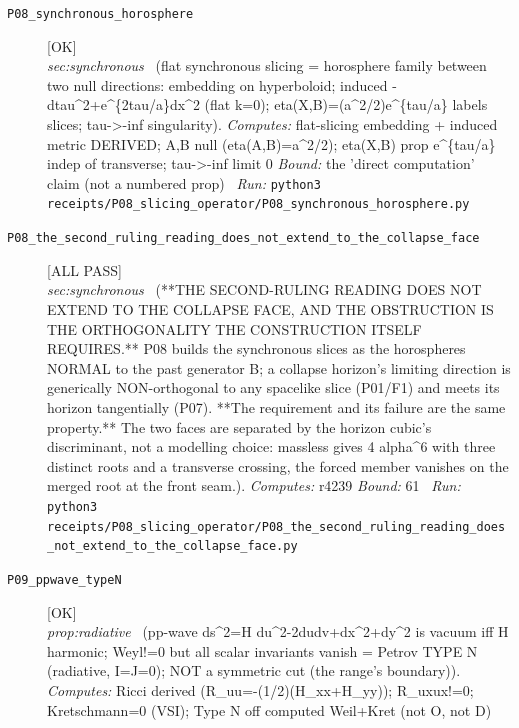 \begin{description}
\item[\label{rcpt:P08_synchronous_horosphere}\texttt{P08\_synchronous\_horosphere}]\hfill\textsf{[OK]}\\
\textit{sec:synchronous} \ (flat synchronous slicing = horosphere family between two null directions: embedding on hyperboloid; induced -dtau\textasciicircum{}2+e\textasciicircum{}\{2tau/a\}dx\textasciicircum{}2 (flat k=0); eta(X,B)=(a\textasciicircum{}2/2)e\textasciicircum{}\{tau/a\} labels slices; tau->-inf singularity). 
\emph{Computes:} flat-slicing embedding + induced metric DERIVED; A,B null (eta(A,B)=a\textasciicircum{}2/2); eta(X,B) prop e\textasciicircum{}\{tau/a\} indep of transverse; tau->-inf limit 0
 \emph{Bound:} the 'direct computation' claim (not a numbered prop)
\ \emph{Run:} \texttt{python3 receipts/P08\_slicing\_operator/P08\_synchronous\_horosphere.py}
\item[\label{rcpt:P08_the_second_ruling_reading_does_not_extend_to_the_collapse_face}\texttt{P08\_the\_second\_ruling\_reading\_does\_not\_extend\_to\_the\_collapse\_face}]\hfill\textsf{[ALL PASS]}\\
\textit{sec:synchronous} \ (**THE SECOND-RULING READING DOES NOT EXTEND TO THE COLLAPSE FACE, AND THE OBSTRUCTION IS THE ORTHOGONALITY THE CONSTRUCTION ITSELF REQUIRES.** P08 builds the synchronous slices as the horospheres NORMAL to the past generator B; a collapse horizon's limiting direction is generically NON-orthogonal to any spacelike slice (P01/F1) and meets its horizon tangentially (P07). **The requirement and its failure are the same property.** The two faces are separated by the horizon cubic's discriminant, not a modelling choice: massless gives 4 alpha\textasciicircum{}6 with three distinct roots and a transverse crossing, the forced member vanishes on the merged root at the front seam.). 
\emph{Computes:} r4239
 \emph{Bound:} 61
\ \emph{Run:} \texttt{python3 receipts/P08\_slicing\_operator/P08\_the\_second\_ruling\_reading\_does\_not\_extend\_to\_the\_collapse\_face.py}
\item[\label{rcpt:P09_ppwave_typeN}\texttt{P09\_ppwave\_typeN}]\hfill\textsf{[OK]}\\
\textit{prop:radiative} \ (pp-wave ds\textasciicircum{}2=H du\textasciicircum{}2-2dudv+dx\textasciicircum{}2+dy\textasciicircum{}2 is vacuum iff H harmonic; Weyl!=0 but all scalar invariants vanish = Petrov TYPE N (radiative, I=J=0); NOT a symmetric cut (the range's boundary)). 
\emph{Computes:} Ricci derived (R\_uu=-(1/2)(H\_xx+H\_yy)); R\_uxux!=0; Kretschmann=0 (VSI); Type N off computed Weil+Kret (not O, not D)

\end{description}
